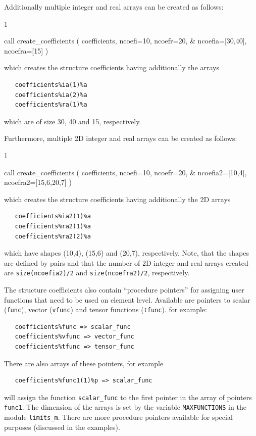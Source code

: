 Additionally multiple integer and real arrays can be created as follows:
\begin{listing}{1}
   
   call create_coefficients ( coefficients, ncoefi=10, ncoefr=20, &
     ncoefia=[30,40], ncoefra=[15] )

\end{listing}
which creates the structure coefficients having additionally the arrays 
\begin{verbatim}
   coefficients%ia(1)%a
   coefficients%ia(2)%a
   coefficients%ra(1)%a
\end{verbatim}
which are of size 30, 40 and 15, respectively. 

Furthermore, multiple 2D integer and real arrays can be created as follows:
\begin{listing}{1}
   
   call create_coefficients ( coefficients, ncoefi=10, ncoefr=20, &
     ncoefia2=[10,4], ncoefra2=[15,6,20,7] )

\end{listing}
which creates the structure coefficients having additionally the 2D arrays 
\begin{verbatim}
   coefficients%ia2(1)%a
   coefficients%ra2(1)%a
   coefficients%ra2(2)%a
\end{verbatim}
which have shapes (10,4), (15,6) and (20,7), respectively. Note, that the shapes are defined by pairs and that
the number of 2D integer and real arrays created are \texttt{size(ncoefia2)/2} and \texttt{size(ncoefra2)/2}, respectively.

The structure coefficients also contain ``procedure pointers'' for assigning user functions
that need to be used on element level. Available are pointers to scalar (\texttt{func}),
vector (\texttt{vfunc}) and tensor functions (\texttt{tfunc}).
for example:
\begin{verbatim}
   coefficients%func => scalar_func
   coefficients%vfunc => vector_func
   coefficients%tfunc => tensor_func
\end{verbatim}
There are also arrays of these pointers, for example
\begin{verbatim}
   coefficients%func1(1)%p => scalar_func
\end{verbatim}
will assign the function \texttt{scalar\_func} to the first pointer in the
array of pointers \texttt{func1}. The dimension of the arrays is set by
the variable \texttt{MAXFUNCTIONS} in the module \texttt{limits\_m}.
There are more procedure pointers available for special purposes (discussed in the examples).

